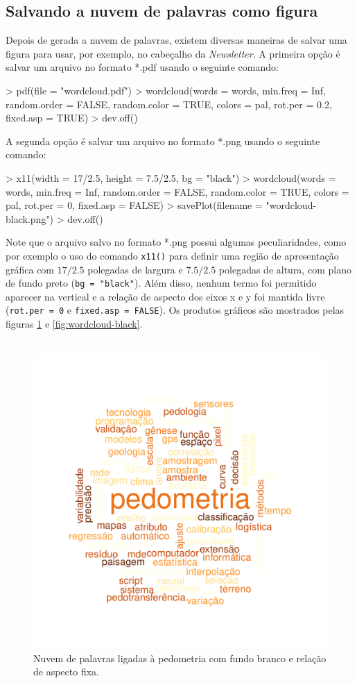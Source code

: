 \subsection{Salvando a nuvem de palavras como figura}
Depois de gerada a nuvem de palavras, existem diversas maneiras de salvar uma figura para usar, por exemplo, no cabeçalho da \textit{Newsletter}. A primeira opção é salvar um arquivo no formato *.pdf usando o seguinte comando:
\begin{smallverbatim}
> pdf(file = "wordcloud.pdf")
> wordcloud(words = words, min.freq = Inf,
random.order = FALSE, random.color = TRUE,
colors = pal, rot.per = 0.2, fixed.asp = TRUE)
> dev.off()
\end{smallverbatim}
A segunda opção é salvar um arquivo no formato *.png usando o seguinte comando:
\begin{smallverbatim}
> x11(width = 17/2.5, height = 7.5/2.5,
bg = "black")
> wordcloud(words = words, min.freq = Inf,
random.order = FALSE, random.color = TRUE,
colors = pal, rot.per = 0, fixed.asp = FALSE)
> savePlot(filename = "wordcloud-black.png")
> dev.off()
\end{smallverbatim}
Note que o arquivo salvo no formato *.png possui algumas peculiaridades, como por exemplo o uso do comando \texttt{x11()} para definir uma região de apresentação gráfica com $17/2.5$ polegadas de largura e $7.5/2.5$ polegadas de altura, com plano de fundo preto (\texttt{bg = "black"}). Além disso, nenhum termo foi permitido aparecer na vertical e a relação de aspecto dos eixos x e y foi mantida livre (\texttt{rot.per = 0} e \texttt{fixed.asp = FALSE}). Os produtos gráficos são mostrados pelas figuras \ref{fig:wordcloud} e \ref{fig:wordcloud-black}.\\
\\
\begin{figure}[htbp]
   \centering
   \includegraphics[scale=0.8]{figuras/wordcloud}
   \caption{Nuvem de palavras ligadas à pedometria com fundo branco e relação de aspecto fixa.}
   \label{fig:wordcloud}
\end{figure}

